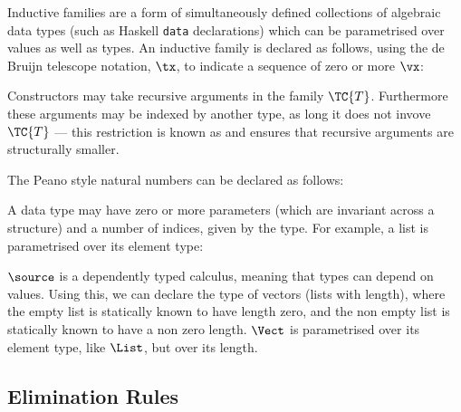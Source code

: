 \label{indfamilies}

Inductive families \cite{dybjer94} are a form of simultaneously
defined collections of algebraic data types (such as Haskell
\texttt{data} declarations) which can be parametrised over values as
well as types.  An inductive family is declared as follows, using
the de Bruijn telescope notation, $\tx$, to indicate a sequence of
zero or more $\vx$:


Constructors may take recursive arguments in the family
$\TC{T}$. Furthermore these arguments may be indexed by another type,
as long it does not invove $\TC{T}$ --- this restriction is known as
 and ensures that recursive arguments are
structurally smaller.

The Peano style natural numbers can be declared as follows:

\DM{
\Data\:\Nat\Hab\Type\:=\:\Z\Hab\Nat\:\mid\:\suc\Hab\fbind{\vk}{\Nat}{\Nat}
}

A data type may have zero or more parameters (which are invariant
across a structure) and a number of indices, given by the type. For
example, a list is parametrised over its element type:

\DM{
\AR{
\Data\:\List\:(\vA\Hab\Type)\Hab\Type\\
\hg\AR{
=\:\nil\Hab\List\:\vA\\
\mid\:\cons\Hab\fbind{\vx}{\vA}{\fbind{\vxs}{\List\:\vA}{\List\:\vA}}
}
}
}

$\source$ is a dependently typed calculus, meaning that types can
depend on values. Using this, we can declare the type of vectors
(lists with length), where the empty list is statically known to have
length zero, and the non empty list is statically known to have a non
zero length. $\Vect$ is parametrised over its element type, like
$\List$, but  over its length. 

\DM{
\AR{
\Data\:\Vect\:(\vA\Hab\Type)\Hab\Nat\to\Type\\
\hg\AR{
=\:\Vnil\Hab\Vect\:\vA\:\Z\\
\mid\:\Vcons\Hab\fbind{\vk}{\Nat}{
\fbind{\vx}{\vA}{\fbind{\vxs}{\Vect\:\vA\:\vk}{\Vect\:\vA\:(\suc\:\vk)}}
}
}
}
}

\subsection{Elimination Rules}

